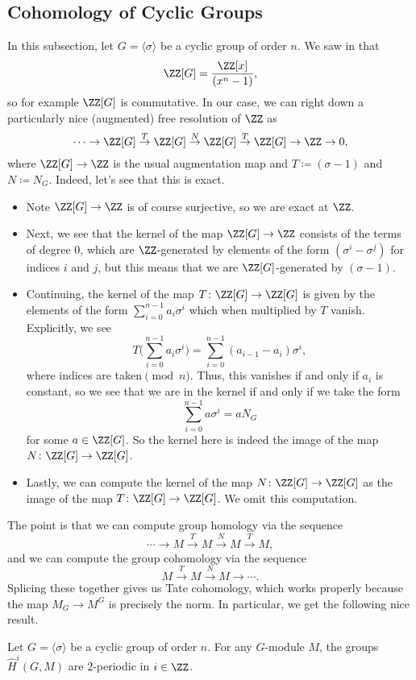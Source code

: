 \documentclass[../notes.tex]{subfiles}
\begin{document}
\subsection{Cohomology of Cyclic Groups}
In this subsection, let $G=\langle\sigma\rangle$ be a cyclic group of order $n$. We saw in  that
\[\ZZ[G]=\frac{\ZZ[x]}{\left(x^n-1\right)},\]
so for example $\ZZ[G]$ is commutative. In our case, we can right down a particularly nice (augmented) free resolution of $\ZZ$ as
\[\cdots\to\ZZ[G]\stackrel T\to\ZZ[G]\stackrel N\to\ZZ[G]\stackrel T\to\ZZ[G]\to\ZZ\to0,\]
where $\ZZ[G]\to\ZZ$ is the usual augmentation map and $T\coloneqq(\sigma-1)$ and $N\coloneqq N_G$. Indeed, let's see that this is exact.
\begin{itemize}
	\item Note $\ZZ[G]\to\ZZ$ is of course surjective, so we are exact at $\ZZ$.
	\item Next, we see that the kernel of the map $\ZZ[G]\to\ZZ$ consists of the terms of degree $0$, which are $\ZZ$-generated by elements of the form $\left(\sigma^i-\sigma^j\right)$ for indices $i$ and $j$, but this means that we are $\ZZ[G]$-generated by $(\sigma-1)$.
	\item Continuing, the kernel of the map $T\colon\ZZ[G]\to\ZZ[G]$ is given by the elements of the form $\sum_{i=0}^{n-1}a_i\sigma^i$ which when multiplied by $T$ vanish. Explicitly, we see
	\[T\Bigg(\sum_{i=0}^{n-1}a_i\sigma^i\Bigg)=\sum_{i=0}^{n-1}\left(a_{i-1}-a_i\right)\sigma^i,\]
	where indices are taken$\pmod n$. Thus, this vanishes if and only if $a_i$ is constant, so we see that we are in the kernel if and only if we take the form
	\[\sum_{i=0}^{n-1}a\sigma^i=aN_G\]
	for some $a\in\ZZ[G]$. So the kernel here is indeed the image of the map $N\colon\ZZ[G]\to\ZZ[G]$.
	\item Lastly, we can compute the kernel of the map $N\colon\ZZ[G]\to\ZZ[G]$ as the image of the map $T\colon\ZZ[G]\to\ZZ[G]$. We omit this computation.
\end{itemize}
The point is that we can compute group homology via the sequence
\[\cdots\to M\stackrel T\to M\stackrel N\to M\stackrel T\to M,\]
and we can compute the group cohomology via the sequence
\[M\stackrel T\to M\stackrel N\to M\to\cdots.\]
Splicing these together gives us Tate cohomology, which works properly because the map $M_G\to M^G$ is precisely the norm. In particular, we get the following nice result.
\begin{proposition}
	Let $G=\langle\sigma\rangle$ be a cyclic group of order $n$. For any $G$-module $M$, the groups $\widehat H^i(G,M)$ are $2$-periodic in $i\in\ZZ$.
\end{proposition}
\end{document}
